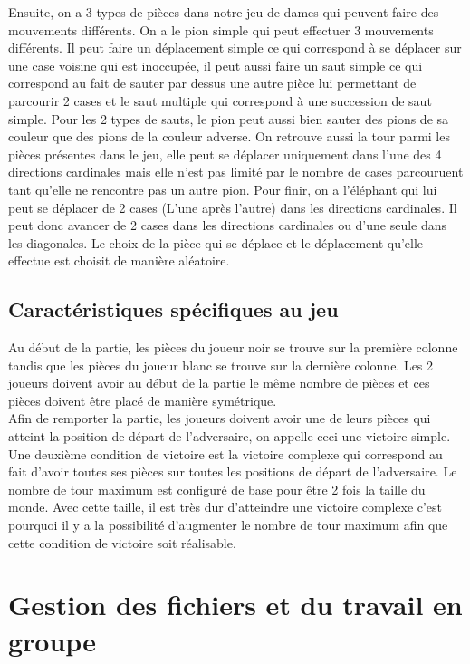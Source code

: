 \documentclass{article}
\begin{document}
Ensuite, on a 3 types de pièces dans notre jeu de dames qui peuvent faire des mouvements différents. On a le pion simple qui peut effectuer 3 mouvements différents. Il peut faire un déplacement simple ce qui correspond à se déplacer sur une case voisine qui est inoccupée, il peut aussi faire un saut simple ce qui correspond au fait de sauter par dessus une autre pièce lui permettant de parcourir 2 cases et le saut multiple qui correspond à une succession de saut simple. Pour les 2 types de sauts, le pion peut aussi bien sauter des pions de sa couleur que des pions de la couleur adverse. On retrouve aussi la tour parmi les pièces présentes dans le jeu, elle peut se déplacer uniquement dans l'une des 4 directions cardinales mais elle n'est pas limité par le nombre de cases parcouruent tant qu'elle ne rencontre pas un autre pion. Pour finir, on a l'éléphant qui lui peut se déplacer de 2 cases (L'une après l'autre) dans les directions cardinales. Il peut donc avancer de 2 cases dans les directions cardinales ou d'une seule dans les diagonales. Le choix de la pièce qui se déplace et le déplacement qu'elle effectue est choisit de manière aléatoire.

\subsection{Caractéristiques spécifiques au jeu}

Au début de la partie, les pièces du joueur noir se trouve sur la première colonne tandis que les pièces du joueur blanc se trouve sur la dernière colonne. Les 2 joueurs doivent avoir au début de la partie le même nombre de pièces et ces pièces doivent être placé de manière symétrique.\\

Afin de remporter la partie, les joueurs doivent avoir une de leurs pièces qui atteint la position de départ de l'adversaire, on appelle ceci une victoire simple. Une deuxième condition de victoire est la victoire complexe qui correspond au fait d'avoir toutes ses pièces sur toutes les positions de départ de l'adversaire. Le nombre de tour maximum est configuré de base pour être 2 fois la taille du monde. Avec cette taille, il est très dur d'atteindre une victoire complexe c'est pourquoi il y a la possibilité d'augmenter le nombre de tour maximum afin que cette condition de victoire soit réalisable.


\section{Gestion des fichiers et du travail en groupe}
\end{document}
